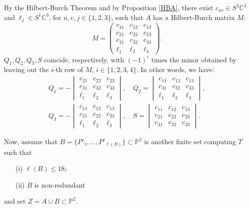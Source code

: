 \documentclass{amsart}
\newcommand{\C}{\mathbb{C}}
\newcommand{\Pj}{\mathbb{P}}
\theoremstyle{definition}
\begin{document}
By the Hilbert-Burch Theorem and by Proposition \ref{HBA},  there exist $ c_{uv}\in S^{2} \C^{3} $ and $ \ell_{j} \in S^1\C^{3} $, for $ u, v,j \in \{1,2,3\} $, 
such that $A$ has a Hilbert-Burch matrix $M$:
\begin{equation}\label{M}
M = \begin{pmatrix} c_{11} & c_{12} & c_{13}\\ c_{21} & c_{22} & c_{23}\\ c_{31} & c_{32} & c_{33}\\ \ell_{1} & \ell_{2} & \ell_{3} \end{pmatrix}.
\end{equation}
$ Q_{1}, Q_{2}, Q_{3}, S $ coincide, respectively, with $ (-1)^{i} $ times the minor obtained by leaving out the $ i $-th row of $M$, $ i \in \{1,2,3,4\} $.
In other words, we have:
\begin{multline}\label{geners}
Q_{1}=-\begin{vmatrix} c_{21} & c_{22} & c_{23}\\ c_{31} & c_{32} & c_{33}\\ \ell_{1} & \ell_{2} & \ell_{3}\end{vmatrix}, \quad
Q_{2}= \begin{vmatrix} c_{11} & c_{12} & c_{13}\\ c_{31} & c_{32} & c_{33}\\ \ell_{1} & \ell_{2} & \ell_{3}\end{vmatrix}, \\
Q_{3}=-\begin{vmatrix} c_{11} & c_{12} & c_{13}\\ c_{21} & c_{22} & c_{23}\\ \ell_{1} & \ell_{2} & \ell_{3}\end{vmatrix}, \quad
S = \begin{vmatrix} c_{11} & c_{12} & c_{13}\\ c_{21} & c_{22} & c_{23}\\ c_{31} & c_{32} & c_{33}\end{vmatrix}.
\end{multline}



\indent Now, assume that $ B = \{P'_{1},\ldots,P'_{\ell(B)}\} \subset \Pj^{2} $ is another finite set computing $ T $ such that
\begin{itemize}
\item[(i)] $\ell(B) \leq 18$;
\item[(ii)] $ B $ is non-redundant
\end{itemize}
and set $ Z = A \cup B \subset \Pj^{2} $.\\
\end{document}
